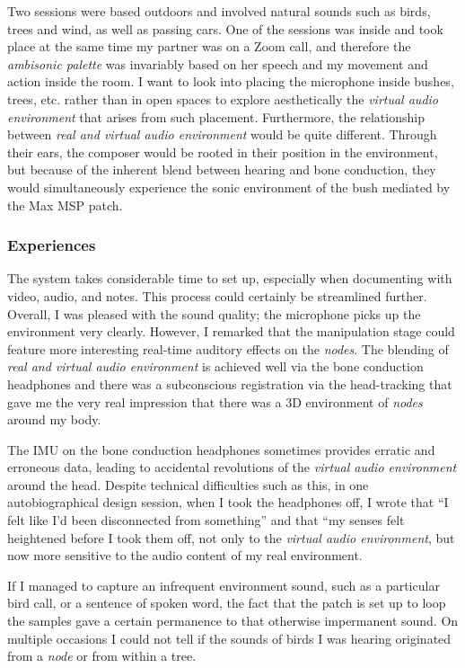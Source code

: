 Two sessions were based outdoors and involved natural sounds such as birds, trees and wind, as well as passing cars. One of the sessions was inside and took place at the same time my partner was on a Zoom call, and therefore the \textit{ambisonic palette} was invariably based on her speech and my movement and action inside the room. I want to look into placing the microphone inside bushes, trees, etc. rather than in open spaces to explore aesthetically the \textit{virtual audio environment} that arises from such placement. Furthermore, the relationship between \textit{real and virtual audio environment} would be quite different. Through their ears, the composer would be rooted in their position in the environment, but because of the inherent blend between hearing and bone conduction, they would simultaneously experience the sonic environment of the bush mediated by the Max MSP patch.

\subsubsection{Experiences}                     \label{sec: area-study-results-experiences}
The system takes considerable time to set up, especially when documenting with video, audio, and notes. This process could certainly be streamlined further. Overall, I was pleased with the sound quality; the microphone picks up the environment very clearly. However, I remarked that the manipulation stage could feature more interesting real-time auditory effects on the \textit{nodes}. The blending of \textit{real and virtual audio environment} is achieved well via the bone conduction headphones and there was a subconscious registration via the head-tracking that gave me the very real impression that there was a 3D environment of \textit{nodes} around my body.

The IMU on the bone conduction headphones sometimes provides erratic and erroneous data, leading to accidental revolutions of the \textit{virtual audio environment} around the head. Despite technical difficulties such as this, in one autobiographical design session, when I took the headphones off, I wrote that “I felt like I'd been disconnected from something” and that “my senses felt heightened before I took them off, not only to the \textit{virtual audio environment}, but now more sensitive to the audio content of my real environment.

If I managed to capture an infrequent environment sound, such as a particular bird call, or a sentence of spoken word, the fact that the patch is set up to loop the samples gave a certain permanence to that otherwise impermanent sound. On multiple occasions I could not tell if the sounds of birds I was hearing originated from a \textit{node} or from within a tree.

